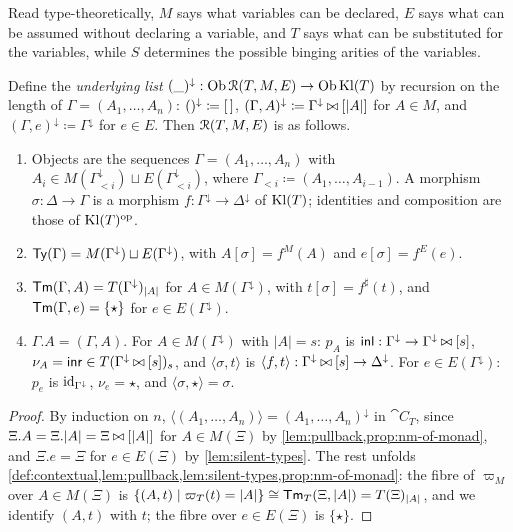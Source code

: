 \begin{remark}
    Read type-theoretically, $M$ says what variables can be declared, $E$ says what can be assumed without declaring a variable, and $T$ says what can be substituted for the variables, while $S$ determines the possible binging arities of the variables.
\end{remark}

\begin{proposition}\label{prop:raw-natural-model}
    Define the \emph{underlying list} $(\_)^{\downarrow} : \operatorname{Ob} \mathcal{R}(T, M, E) \to \operatorname{Ob} \mathrm{Kl}(T)$ by recursion on the length of $\Gamma = (A_1, \ldots, A_n)$: $()^{\downarrow} \coloneqq \left[\,\right]$, $(\Gamma, A)^{\downarrow} \coloneqq \Gamma^{\downarrow} \mathbin{\bowtie} [|A|]$ for $A \in M$, and $(\Gamma, e)^{\downarrow} \coloneqq \Gamma^{\downarrow}$ for $e \in E$. Then $\mathcal{R}(T, M, E)$ is as follows.
    \begin{enumerate}
        \item Objects are the sequences $\Gamma = (A_1, \ldots, A_n)$ with $A_i \in M(\Gamma_{<i}^{\downarrow}) \sqcup E(\Gamma_{<i}^{\downarrow})$, where $\Gamma_{<i} \coloneqq (A_1, \ldots, A_{i-1})$. A morphism $\sigma : \Delta \to \Gamma$ is a morphism $f : \Gamma^{\downarrow} \to \Delta^{\downarrow}$ of $\mathrm{Kl}(T)$; identities and composition are those of $\mathrm{Kl}(T)^{\mathrm{op}}$.
        \item $\mathsf{Ty}(\Gamma) = M(\Gamma^{\downarrow}) \sqcup E(\Gamma^{\downarrow})$, with $A[\sigma] = f^M(A)$ and $e[\sigma] = f^E(e)$.
        \item $\mathsf{Tm}(\Gamma, A) = T(\Gamma^{\downarrow})_{|A|}$ for $A \in M(\Gamma^{\downarrow})$, with $t[\sigma] = f^\sharp(t)$, and $\mathsf{Tm}(\Gamma, e) = \{\star\}$ for $e \in E(\Gamma^{\downarrow})$.
        \item $\Gamma.A = (\Gamma, A)$. For $A \in M(\Gamma^{\downarrow})$ with $|A| = s$: $p_A$ is $\mathsf{inl} : \Gamma^{\downarrow} \to \Gamma^{\downarrow} \mathbin{\bowtie} [s]$, $\nu_A = \mathsf{inr} \in T(\Gamma^{\downarrow} \mathbin{\bowtie} [s])_s$, and $\langle \sigma, t \rangle$ is $\langle f, t \rangle : \Gamma^{\downarrow} \mathbin{\bowtie} [s] \to \Delta^{\downarrow}$. For $e \in E(\Gamma^{\downarrow})$: $p_e$ is $\mathrm{id}_{\Gamma^{\downarrow}}$, $\nu_e = \star$, and $\langle \sigma, \star \rangle = \sigma$.
    \end{enumerate}
\end{proposition}

\begin{proof}
    By induction on $n$, $\langle (A_1, \ldots, A_n) \rangle = (A_1, \ldots, A_n)^{\downarrow}$ in $\cat{C}_T$, since $\Xi.A = \Xi.|A| = \Xi \mathbin{\bowtie} [|A|]$ for $A \in M(\Xi)$ by \cref{lem:pullback,prop:nm-of-monad}, and $\Xi.e = \Xi$ for $e \in E(\Xi)$ by \cref{lem:silent-types}. The rest unfolds \cref{def:contextual,lem:pullback,lem:silent-types,prop:nm-of-monad}: the fibre of $\varpi_M$ over $A \in M(\Xi)$ is $\{(A, t) \mid \varpi_T(t) = |A|\} \cong \mathsf{Tm}_T(\Xi, |A|) = T(\Xi)_{|A|}$, and we identify $(A, t)$ with $t$; the fibre over $e \in E(\Xi)$ is $\{\star\}$.
\end{proof}

